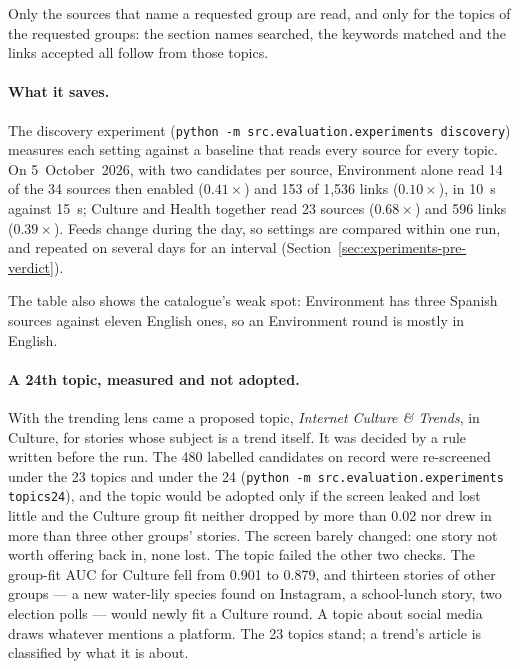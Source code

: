 Only the sources that name a requested group are read, and only for
the topics of the requested groups: the section names searched, the
keywords matched and the links accepted all follow from those topics.

\paragraph{What it saves.} The discovery experiment
(\texttt{python -m src.evaluation.experiments discovery}) measures each
setting against a baseline that reads every source for every topic. On
5~October~2026, with two candidates per source, Environment alone read
14 of the 34 sources then enabled ($0.41\times$) and 153 of 1,536 links
($0.10\times$), in 10~s against 15~s; Culture and Health together read
23 sources ($0.68\times$) and 596 links ($0.39\times$). Feeds change
during the day, so settings are compared within one run, and repeated
on several days for an interval (Section~\ref{sec:experiments-pre-verdict}).

The table also shows the catalogue's weak spot: Environment has three
Spanish sources against eleven English ones, so an Environment round
is mostly in English.

\paragraph{A 24th topic, measured and not adopted.} With the trending
lens came a proposed topic, \emph{Internet Culture \& Trends}, in
Culture, for stories whose subject is a trend itself. It was decided by a
rule written before the run. The 480 labelled candidates on record were
re-screened under the 23 topics and under the 24 (\texttt{python -m
src.evaluation.experiments topics24}), and the topic would be adopted
only if the screen leaked and lost little and the Culture group fit
neither dropped by more than 0.02 nor drew in more than three other
groups' stories. The screen barely changed: one story not worth offering
back in, none lost. The topic failed the other two checks. The group-fit
AUC for Culture fell from 0.901 to 0.879, and thirteen stories of other
groups --- a new water-lily species found on Instagram, a school-lunch
story, two election polls --- would newly fit a Culture round. A topic
about social media draws whatever mentions a platform. The 23 topics
stand; a trend's article is classified by what it is about.
